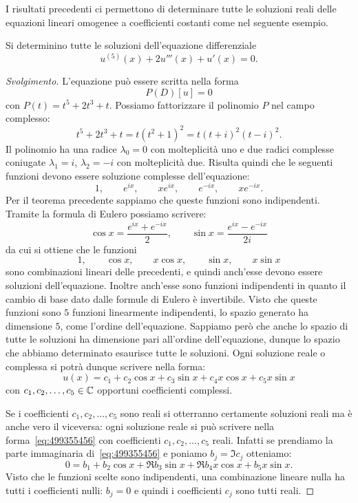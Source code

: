 I risultati precedenti ci permettono di determinare tutte le soluzioni reali delle equazioni lineari omogenee a coefficienti costanti come nel seguente esempio.

\begin{example}
Si determinino tutte le soluzioni dell'equazione differenziale
\[
  u^{(5)}(x) + 2 u'''(x) + u'(x) = 0.
\]
\end{example}
%
\begin{proof}[Svolgimento]
L'equazione può essere scritta nella forma
\[
  P(D) [u] = 0
\]
con $P(t) = t^5 + 2 t^3+t$. Possiamo fattorizzare il polinomio $P$ nel campo complesso:
\[
t^5 + 2t^3 +t = t(t^2+1)^2 = t (t+i)^2(t-i)^2.
\]
Il polinomio ha una radice $\lambda_0=0$ con molteplicità uno e due radici complesse coniugate $\lambda_1 = i$, $\lambda_2=-i$ con molteplicità due.
Risulta quindi che le seguenti funzioni devono essere soluzione complesse dell'equazione:
\[
  1, \qquad
  e^{ix}, \qquad
  x e^{ix}, \qquad
  e^{-ix}, \qquad
  x e^{-ix}.
\]
Per il teorema precedente sappiamo che queste funzioni sono indipendenti.
Tramite la formula di Eulero possiamo scrivere:
\[
  \cos x = \frac{e^{ix}+e^{-ix}}{2},
  \qquad
  \sin x = \frac{e^{ix}-e^{-ix}}{2i}
\]
da cui si ottiene che le funzioni
\begin{equation}\label{eq:4995566}
 1, \qquad
 \cos x, \qquad
 x \cos x, \qquad
 \sin x, \qquad
 x \sin x
\end{equation}
sono combinazioni lineari delle precedenti, e quindi anch'esse devono essere soluzioni dell'equazione.
Inoltre anch'esse sono funzioni indipendenti in quanto il cambio di base dato dalle formule di Eulero è invertibile.
Visto che queste funzioni sono $5$ funzioni linearmente indipendenti, lo spazio generato ha dimensione $5$, come l'ordine dell'equazione.
Sappiamo però che anche lo spazio di tutte le soluzioni ha dimensione pari all'ordine dell'equazione, dunque lo spazio che abbiamo determinato esaurisce tutte le soluzioni. Ogni soluzione reale o complessa si potrà dunque scrivere nella forma:
\begin{equation}\label{eq:499355456}
  u(x) = c_1 + c_2 \cos x + c_3 \sin x + c_4 x \cos x + c_5 x \sin x
\end{equation}
con $c_1, c_2, \dots, c_5 \in \mathbb C$ opportuni coefficienti
complessi.

Se i coefficienti $c_1, c_2, \dots, c_5$ sono reali si otterranno
certamente soluzioni reali ma è anche vero il viceversa: ogni soluzione reale si può scrivere nella forma~\eqref{eq:499355456}
con coefficienti $c_1, c_2, \dots, c_5$ reali.
Infatti se prendiamo la parte immaginaria di~\eqref{eq:499355456}
e poniamo $b_j= \Im c_j$
otteniamo:
\[
 0 = b_1 + b_2 \cos x + \Re b_3 \sin x + \Re b_4 x \cos x + b_5 x \sin x.
\]
Visto che le funzioni scelte sono indipendenti, una combinazione
lineare nulla ha tutti i coefficienti nulli: $b_j=0$ e quindi
i coefficienti $c_j$ sono tutti reali.
\end{proof}


